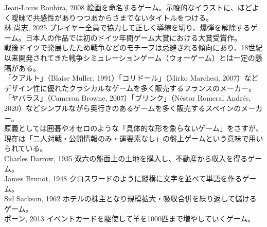 \begin{tcolorbox}[colback=white,colframe=black,title=本文中で挙げたゲームについての注記]
[12] Jean-Louis Roubira, 2008 絵画を命名するゲーム。示唆的なイラストに、ほどよく曖昧で共感性がありつつあからさまでないタイトルをつける。\\\relax
[13] 林 尚志, 2025 プレイヤー全員で協力して正しく導線を切り、爆弾を解除するゲーム。日本人の作品では初のドイツ年間ゲーム大賞における大賞受賞作。\\\relax
[14] 戦後ドイツで発展したため戦争などのモチーフは忌避される傾向にあり、18世紀以来開発されてきた戦争シミュレーションゲーム（ウォーゲーム）とは一定の懸隔がある。\\\relax
[15] 「クアルト」（Blaise Muller, 1991）「コリドール」（Mirko Marchesi, 2007）などデザイン性に優れたクラシカルなゲームを多く販売するフランスのメーカー。\\\relax
[16] 「ヤバラス」（Cameron Browne, 2007）「ブリンク」（Néstor Romeral Andrés, 2020）などシンプルながら奥行きのあるゲームを多く販売するスペインのメーカー。\\\relax
[17] 原義としては囲碁やオセロのような「具体的な形を象らないゲーム」をさすが、現在は「二人対戦・公開情報のみ・運要素なし」の盤上ゲームという意味で用いられている。\\\relax
[18] Charles Darrow, 1935 双六の盤面上の土地を購入し、不動産から収入を得るゲーム。\\\relax
[19] James Brunot, 1948 クロスワードのように縦横に文字を並べて単語を作るゲーム。\\\relax
[20] Sid Sackson, 1962 ホテルの株主となり規模拡大・吸収合併を繰り返して儲けるゲーム。\\\relax
[21] ポーン, 2013 イベントカードを駆使して羊を1000匹まで増やしていくゲーム。
\end{tcolorbox}
